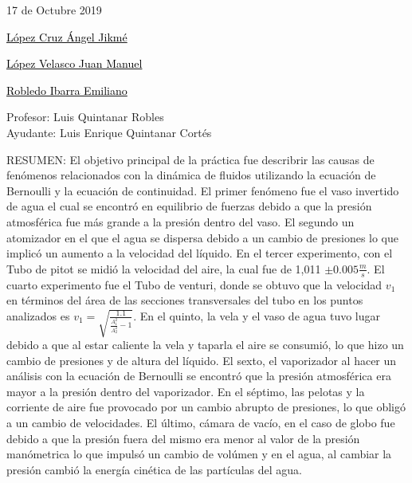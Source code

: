 \documentclass[10pt,a4paper]{article}
\begin{document}
\vspace{.7 cm}
\begin{flushleft}{\Large 17 de Octubre 2019  }\\[0.6cm]
\end{flushleft}
\begin{flushright}{\Large{\underline{\textcolor{black}{López Cruz Ángel Jikmé}}}}\\[0.78cm]
\end{flushright}
\begin{flushright}{\Large{\underline{\textcolor{black}{López Velasco Juan Manuel}}}}\\[0.78cm]

\begin{flushright}{\Large{\underline{\textcolor{black}{Robledo Ibarra Emiliano}}}}\\[0.78cm]
\end{flushright}\end{flushright}
\begin{center}
{\Large Profesor: Luis Quintanar Robles }\\[0.4cm]
{\Large Ayudante: Luis Enrique Quintanar Cortés }\\[0.4cm]
\end{center}
RESUMEN: El objetivo principal de la práctica fue describrir las causas de fenómenos relacionados con la dinámica de fluidos utilizando la ecuación de Bernoulli y la ecuación de continuidad. El primer fenómeno fue el vaso invertido de agua el cual se encontró en equilibrio de fuerzas debido a que la presión atmosférica fue más grande a la presión dentro del vaso. El segundo un atomizador en el que el agua se dispersa debido a un cambio de presiones lo que implicó un aumento a la velocidad del líquido. En el tercer experimento, con el Tubo de pitot se midió la velocidad del aire, la cual fue de 1,011 $\pm 0.005 \frac{m}{s}$. El cuarto experimento fue el Tubo de venturi, donde se obtuvo que la velocidad $v_1$ en términos del área de las secciones transversales del tubo en los puntos analizados es $ v_1 = \sqrt{\frac{1.1}{\frac{A^{2}_1}{A^{2}_2}-1}} $. En el quinto, la vela y el vaso de agua tuvo lugar debido a que al estar caliente la vela y taparla el aire se consumió, lo que hizo un cambio de presiones y de altura del líquido. El sexto, el vaporizador al hacer un análisis con la ecuación de Bernoulli se encontró que la presión atmosférica era mayor a la presión dentro del vaporizador. En el séptimo, las pelotas y la corriente de aire fue provocado por un cambio abrupto de presiones, lo que obligó a un cambio de velocidades. El último, cámara de vacío, en el caso de globo fue debido a que la presión fuera del mismo era menor al valor de la presión manómetrica lo que impulsó un cambio de volúmen y en el agua, al cambiar la presión cambió la energía cinética de las partículas del agua.
\end{document}
